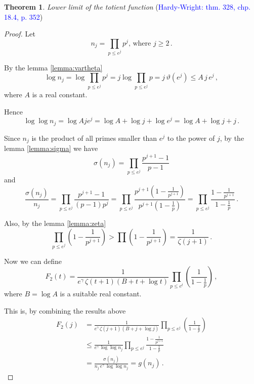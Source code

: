 \documentclass{article}
\theoremstyle{definition}
\newtheorem{theorem}[subsection]{Theorem}
\begin{document}
\begin{theorem}{\emph{Lower limit of the totient function} (\textcolor{blue}{Hardy-Wright: thm. 328, chp. 18.4, p. 352})}
\begin{proof}
Let
\begin{equation*}
    n_j=\prod_{p\leq e^j} p^j\text{, where } j\geq 2\,.
\end{equation*}

By the lemma \ref{lemma:vartheta}
\begin{equation*}
    \log n_j = \log \prod_{p\leq e^j} p^j = j \log \prod_{p\leq e^j} p = j\,\vartheta(e^j) \leq A\,j\,e^j\,,
\end{equation*}
where $A$ is a real constant.

Hence
\begin{equation*}
\label{eq:lognj}
    \log \log n_j = \log Aje^j = \log A + \log j + \log e^j = \log A + \log j + j\,.
\end{equation*}

Since $n_j$ is the product of all primes smaller than $e^j$ to the power of $j$, by the lemma \ref{lemma:sigma} we have
\begin{equation*}
    \sigma(n_j) = \prod_{p\leq e^j} \frac{p^{j+1}-1}{p-1}
\end{equation*}
and
\begin{equation*}
    \frac{\sigma(n_j)}{n_j} = \prod_{p\leq e^j} \frac{p^{j+1}-1}{(p-1)p^j} = \prod_{p\leq e^j} \frac{p^{j+1}\left(1-\frac{1}{p^{j+1}}\right)}{p^{j+1}\left(1-\frac{1}{p}\right)} = \prod_{p\leq e^j} \frac{1-\frac{1}{p^{j+1}}}{1-\frac{1}{p}}\,.
\end{equation*}

Also, by the lemma \ref{lemma:zeta}
\begin{equation*}
    \prod_{p\leq e^j}\left(1-\frac{1}{p^{j+1}}\right) > \prod \left(1-\frac{1}{p^{j+1}}\right) = \frac{1}{\zeta(j+1)}\,.
\end{equation*}

Now we can define
\begin{equation*}
    F_2(t)=\frac{1}{e^\gamma\,\zeta(t+1)(B+t+\log t)} \prod_{p\leq e^t} \left(\frac{1}{1-\frac{1}{p}}\right)\,,
\end{equation*}
where $B=\log A$ is a suitable real constant.

This is, by combining the results above
\begin{align*}
    F_2(j)& = \frac{1}{e^\gamma\,\zeta(j+1)(B+j+\log j)} \prod_{p\leq e^j} \left(\frac{1}{1-\frac{1}{p}}\right)\\
    & \leq \frac{1}{e^\gamma\,\log \log n_j} \prod_{p\leq e^j} \frac{1-\frac{1}{p^{j+1}}}{1-\frac{1}{p}}\\
    & = \frac{\sigma(n_j)}{n_j\,e^\gamma\,\log \log n_j} = g(n_j)\,.
\end{align*}


\end{proof}
\end{theorem}
\end{document}
